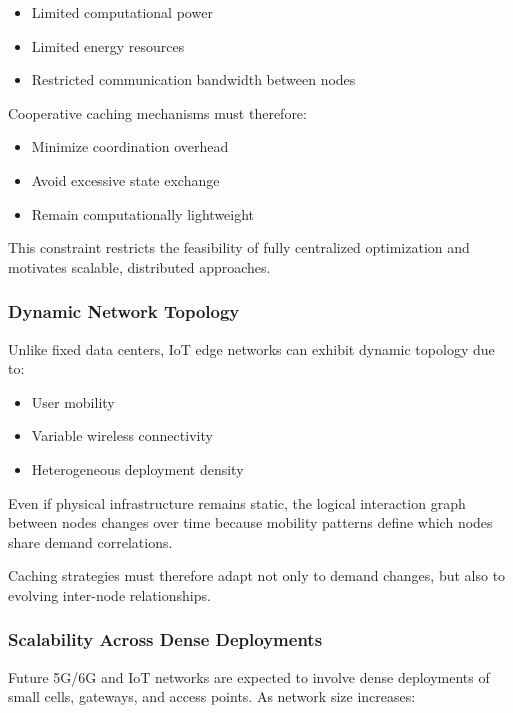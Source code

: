 \begin{itemize}
    \item Limited computational power
    \item Limited energy resources
    \item Restricted communication bandwidth between nodes
\end{itemize}

Cooperative caching mechanisms must therefore:

\begin{itemize}
    \item Minimize coordination overhead
    \item Avoid excessive state exchange
    \item Remain computationally lightweight
\end{itemize}

This constraint restricts the feasibility of fully centralized optimization and motivates scalable, distributed approaches.

\subsubsection{Dynamic Network Topology}

Unlike fixed data centers, IoT edge networks can exhibit dynamic topology due to:

\begin{itemize}
    \item User mobility
    \item Variable wireless connectivity
    \item Heterogeneous deployment density
\end{itemize}

Even if physical infrastructure remains static, the logical interaction graph between nodes changes over time because mobility patterns define which nodes share demand correlations.

Caching strategies must therefore adapt not only to demand changes, but also to evolving inter-node relationships.

\subsubsection{Scalability Across Dense Deployments}

Future 5G/6G and IoT networks are expected to involve dense deployments of small cells, gateways, and access points. As network size increases:

